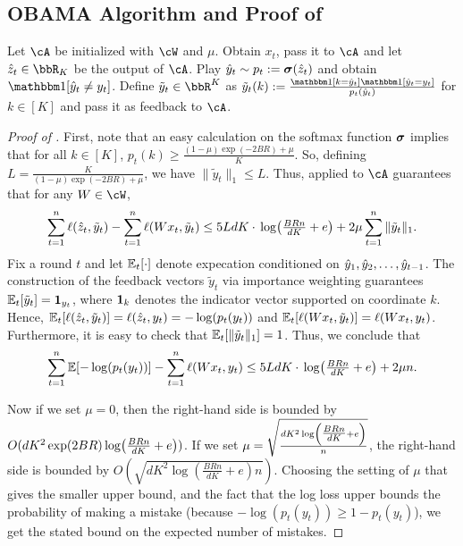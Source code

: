 
\subsection{OBAMA Algorithm and Proof of }

\begin{algorithm}[h]
\caption{}
\label{alg:bandit_multiclass}
\begin{algorithmic}[1]
\State Let $\cA$ be  initialized with $\cW$ and $\mu$.
\State Obtain $x_t$, pass it to $\cA$ and let $\zh_t \in \R_K$ be the output of $\cA$.
\State Play $\yh_t \sim p_t := \mb{\sigma}(\zh_t)$ and obtain $\ind[\yh_t \neq y_t]$.
\State Define $\tilde{y}_t \in \R^K$ as $\tilde{y}_t(k) := \frac{\ind[k = \yh_t]\ind[\hy_t = y_t]}{p_t(\yh_t)}$ for $k \in [K]$ and pass it as feedback to $\cA$.
\EndFor
\EndProcedure
\end{algorithmic}
\end{algorithm}



\label{app:bandit_multiclass_proofs}
\begin{proof}[Proof of ]
First, note that an easy calculation on the softmax function $\mb{\sigma}$ implies that for all $k \in [K]$, $p_t(k) \geq \frac{(1-\mu) \exp(-2BR) + \mu}{K}$. So, defining $L = \frac{K}{(1-\mu) \exp(-2BR) + \mu}$, we have $\|\tilde{y}_t\|_1 \leq L$. Thus,  applied to $\cA$ guarantees that for any $W \in \cW$, 
\[\sum_{t=1}^{n}\ls(\zh_t,\tilde{y}_t) - \sum_{t=1}^{n}\ls(Wx_t,\tilde{y}_t) \leq{} 5LdK\cdot{}\log\prn*{\tfrac{BRn}{dK} + e} + 2\mu{}\sum_{t=1}^n \|\tilde{y}_t\|_1.\]
Fix a round $t$ and let $\En_t[\cdot]$ denote expecation conditioned on $\yh_1, \yh_2, \ldots, \yh_{t-1}$. The construction of the feedback vectors $\tilde{y}_t$ via importance weighting guarantees $\En_t[\tilde{y}_t] = \mb{1}_{y_t}$, where $\mb{1}_k$ denotes the indicator vector supported on coordinate $k$. Hence, $\En_t[\ell(\zh_t, \tilde{y}_t)] = \ell(\zh_t, y_t) = -\log(p_t(y_t))$ and $\En_t[\ell(Wx_t, \tilde{y}_t)] = \ell(Wx_t, y_t)$. Furthermore, it is easy to check that $\En_t[\|\tilde{y}_t\|_1] = 1$. Thus, we conclude that
\[\sum_{t=1}^{n}\En[-\log(p_t(y_t))] - \sum_{t=1}^{n}\ls(Wx_t,y_t) \leq{} 5LdK\cdot{}\log\prn*{\tfrac{BRn}{dK} + e} + 2\mu{}n.\]

Now if we set $\mu = 0$, then the right-hand side is bounded by $O(dK^2\exp(2BR)\log\prn*{\tfrac{BRn}{dK} + e})$. If we set $\mu = \sqrt{\frac{dK^2\log\prn*{\tfrac{BRn}{dK} + e}}{n}}$, the right-hand side is bounded by $O\left(\sqrt{dK^2\log(\tfrac{BRn}{dK} + e)n}\right)$. Choosing the setting of $\mu$ that gives the smaller upper bound, and the fact that the log loss upper bounds the probability of making a mistake (because $-\log(p_t(y_t)) \geq 1 - p_t(y_t)$), we get the stated bound on the expected number of mistakes.
\end{proof}



